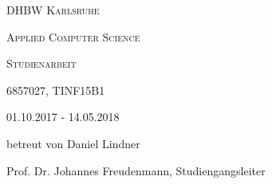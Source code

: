 \makeatletter
\begin{titlepage}
\centering
	{\scshape\LARGE DHBW Karlsruhe \par}
	{\scshape Applied Computer Science \par}
	\vspace{1cm}
	{\scshape\Large Studienarbeit\par}
	\vspace{1.5cm}
	{\huge\textbf{\@title} \par}
	\vspace{2cm}
	{\Large \@author \par}
	{\Large 6857027, TINF15B1 \par}
	\vspace{6cm}
	
	{\scshape
	01.10.2017 - 14.05.2018\par
	betreut von Daniel Lindner \par 
	Prof. Dr. Johannes Freudenmann, Studiengangsleiter}

\end{titlepage}